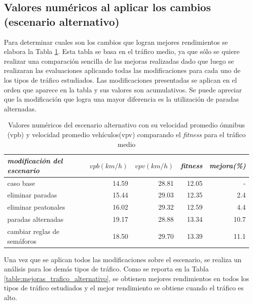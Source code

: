 \subsection{Valores numéricos al aplicar los cambios (escenario alternativo)}

Para determinar cuales son los cambios que logran mejores rendimientos se elabora la Tabla \ref{table:resultado_alternativo}. Esta tabla se basa en el tráfico medio, ya que sólo se quiere realizar una comparación sencilla de las mejoras realizadas dado que luego se realizaran las evaluaciones aplicando todas las modificaciones para cada uno de los tipos de tráfico estudiados. Las modificaciones presentadas se aplican en el orden que aparece en la tabla y sus valores son acumulativos. Se puede apreciar que la modificación que logra una mayor diferencia es la utilización de paradas alternadas.


\begin{table}[H]
	\renewcommand{\arraystretch}{1.2}
	\caption[Valores numéricos del escenario alternativo]{Valores numéricos del escenario alternativo con su velocidad promedio ómnibus (vpb) y velocidad promedio vehículos(vpv) comparando el \emph{fitness} para el tráfico medio }
	\label{table:resultado_alternativo}
	\centering
	\begin{tabular}{lrrrr }
		\hline
		\textit{modificación del escenario} &
		\textit{$vpb(km/h)$} & 
		\textit{$vpv(km/h)$} & 
		\emph{fitness} &
		\textit{mejora(\%)}
		\\ 
		\hline
		caso base & 14.59  & 28.81& 12.05 & -\\
		eliminar paradas & 15.44  & 29.03& 12.35 & 2.4\\
		eliminar peatonales  & 16.02  & 29.32& 12.59 & 4.4\\
		paradas alternadas  & 19.17  & 28.88& 13.34 & 10.7\\	
		cambiar reglas de semáforos  & 18.50  & 29.70& 13.39 & 11.1\\				
		\hline
	\end{tabular}
\end{table}

\newpage

Una vez que se aplican todos las modificaciones sobre el escenario, se realiza un análisis para los demás tipos de tráfico. Como se reporta en la Tabla \ref{table:mejoras_trafico_alternativo}, se obtienen mejores rendimientos en todos los tipos de tráfico estudiados y el mejor rendimiento se obtiene cuando el tráfico es alto. 

